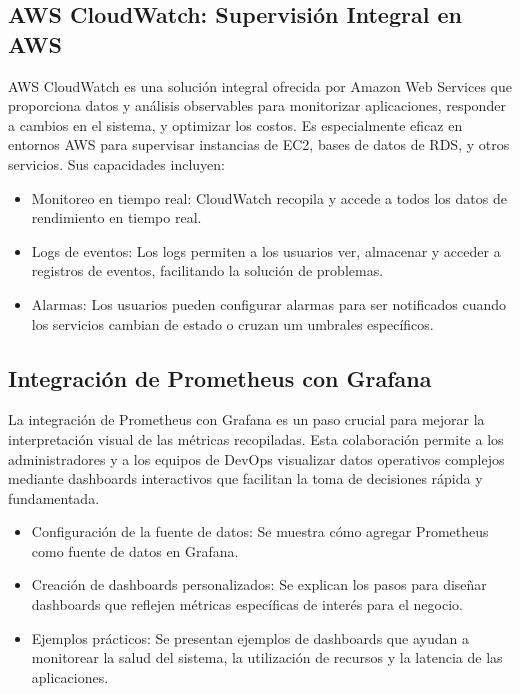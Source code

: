 {        \subsection{AWS CloudWatch: Supervisión Integral en AWS}
            AWS CloudWatch es una solución integral ofrecida por Amazon Web Services que proporciona datos y análisis observables para monitorizar aplicaciones, responder a cambios en el sistema, y optimizar los costos. Es especialmente eficaz en entornos AWS para supervisar instancias de EC2, bases de datos de RDS, y otros servicios. Sus capacidades incluyen:

            \begin{itemize}
                \item Monitoreo en tiempo real: CloudWatch recopila y accede a todos los datos de rendimiento en tiempo real.
                \item Logs de eventos: Los logs permiten a los usuarios ver, almacenar y acceder a registros de eventos, facilitando la solución de problemas.
                \item Alarmas: Los usuarios pueden configurar alarmas para ser notificados cuando los servicios cambian de estado o cruzan um umbrales específicos.
            \end{itemize}
            
        \subsection{Integración de Prometheus con Grafana}
            La integración de Prometheus con Grafana es un paso crucial para mejorar la interpretación visual de las métricas recopiladas. Esta colaboración permite a los administradores y a los equipos de DevOps visualizar datos operativos complejos mediante dashboards interactivos que facilitan la toma de decisiones rápida y fundamentada.
            
            \begin{itemize}
                \item Configuración de la fuente de datos: Se muestra cómo agregar Prometheus como fuente de datos en Grafana.
                \item Creación de dashboards personalizados: Se explican los pasos para diseñar dashboards que reflejen métricas específicas de interés para el negocio.
                \item Ejemplos prácticos: Se presentan ejemplos de dashboards que ayudan a monitorear la salud del sistema, la utilización de recursos y la latencia de las aplicaciones.
            \end{itemize}
            
}
